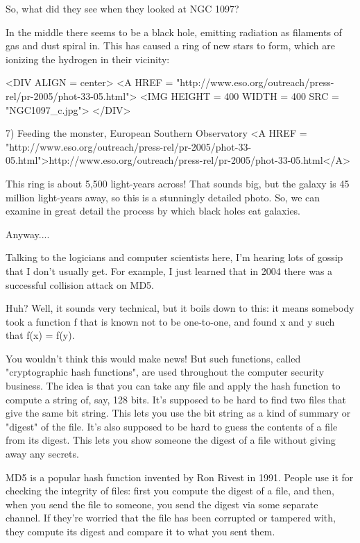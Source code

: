 So, what did they see when they looked at NGC 1097?

In the middle there seems to be a black hole, emitting radiation 
as filaments of gas and dust spiral in.  This has caused a ring
of new stars to form, which are ionizing the hydrogen in their vicinity:

<DIV ALIGN = center>
<A HREF = "http://www.eso.org/outreach/press-rel/pr-2005/phot-33-05.html">
<IMG HEIGHT = 400 WIDTH = 400 SRC = "NGC1097_c.jpg">
</DIV>

7) Feeding the monster, European Southern Observatory
<A HREF = "http://www.eso.org/outreach/press-rel/pr-2005/phot-33-05.html">http://www.eso.org/outreach/press-rel/pr-2005/phot-33-05.html</A>

This ring is about 5,500 light-years across!  That sounds big, but the
galaxy is 45 million light-years away, so this is a stunningly detailed
photo.  So, we can examine in great detail the process by which black
holes eat galaxies.

Anyway....

Talking to the logicians and computer scientists here, I'm hearing
lots of gossip that I don't usually get.  For example, I just learned
that in 2004 there was a successful collision attack on MD5.

Huh?  Well, it sounds very technical, but it boils down to this: it 
means somebody took a function f that is known not to be one-to-one,
and found x and y such that f(x) = f(y).  

You wouldn't think this would make news!  But such functions, called 
"cryptographic hash functions", are used throughout the computer security 
business.   The idea is that you can take any file and apply the hash 
function to compute a string of, say, 128 bits.  It's supposed to be hard 
to find two files that give the same bit string.  This lets you use the
bit string as a kind of summary or "digest" of the file.  It's also 
supposed to be hard to guess the contents of a file from its digest.
This lets you show someone the digest of a file without giving away
any secrets.

MD5 is a popular hash function invented by Ron Rivest in 1991.  People
use it for checking the integrity of files: first you compute the digest 
of a file, and then, when you send the file to someone, you send the
digest via some separate channel.
If they're worried that the file has been corrupted or 
tampered with, they compute its digest and compare it to what you sent them.  

